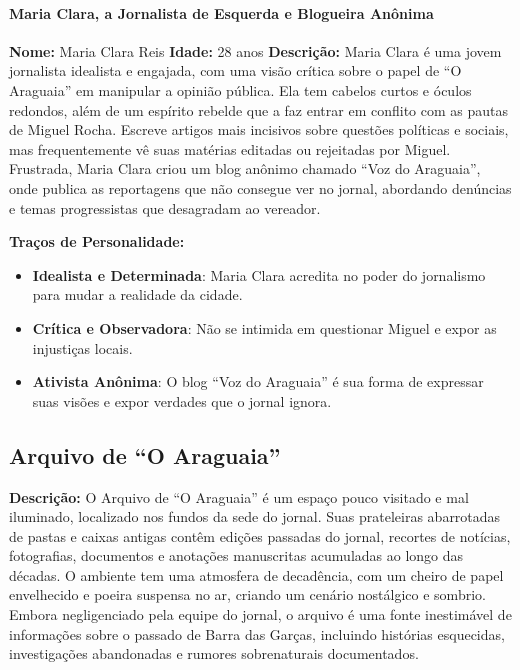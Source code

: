 \begin{personagem}
 

\paragraph{Maria Clara, a Jornalista de Esquerda e Blogueira Anônima}  
\textbf{Nome:} Maria Clara Reis  
\textbf{Idade:} 28 anos  
\textbf{Descrição:}  
Maria Clara é uma jovem jornalista idealista e engajada, com uma visão crítica sobre o papel de ``O Araguaia'' em manipular a opinião pública. Ela tem cabelos curtos e óculos redondos, além de um espírito rebelde que a faz entrar em conflito com as pautas de Miguel Rocha. Escreve artigos mais incisivos sobre questões políticas e sociais, mas frequentemente vê suas matérias editadas ou rejeitadas por Miguel. Frustrada, Maria Clara criou um blog anônimo chamado ``Voz do Araguaia'', onde publica as reportagens que não consegue ver no jornal, abordando denúncias e temas progressistas que desagradam ao vereador.

\textbf{Traços de Personalidade:}
\begin{itemize}
    \item \textbf{Idealista e Determinada}: Maria Clara acredita no poder do jornalismo para mudar a realidade da cidade.
    \item \textbf{Crítica e Observadora}: Não se intimida em questionar Miguel e expor as injustiças locais.
    \item \textbf{Ativista Anônima}: O blog ``Voz do Araguaia'' é sua forma de expressar suas visões e expor verdades que o jornal ignora.
\end{itemize}
\end{personagem}



\subsection{Arquivo de ``O Araguaia''}

\textbf{Descrição:}  
O Arquivo de ``O Araguaia'' é um espaço pouco visitado e mal iluminado, localizado nos fundos da sede do jornal. Suas prateleiras abarrotadas de pastas e caixas antigas contêm edições passadas do jornal, recortes de notícias, fotografias, documentos e anotações manuscritas acumuladas ao longo das décadas. O ambiente tem uma atmosfera de decadência, com um cheiro de papel envelhecido e poeira suspensa no ar, criando um cenário nostálgico e sombrio. Embora negligenciado pela equipe do jornal, o arquivo é uma fonte inestimável de informações sobre o passado de Barra das Garças, incluindo histórias esquecidas, investigações abandonadas e rumores sobrenaturais documentados.

